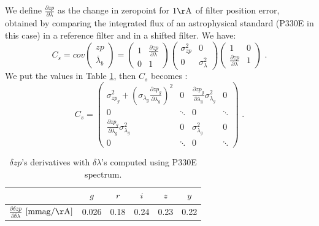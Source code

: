 \documentclass[\docopts]{\docclass}
\begin{document}
We define $\frac{\partial zp}{\partial \lambda}$ as the change in zeropoint for $1 \mathrm{\AA}$ of filter position error, obtained by comparing the integrated flux of an astrophysical standard (P330E in this case) in a reference filter and in a shifted filter.
We have:
\begin{equation}
C_s = cov
\begin{pmatrix}
  zp \\
  \bar\lambda_b
\end{pmatrix}
=
\begin{pmatrix}
  1 & \frac{\partial zp}{\partial \lambda} \\
  0 & 1
\end{pmatrix}
\begin{pmatrix}
  \sigma_{zp}^2 & 0 \\
  0 & \sigma_{\lambda}^2
\end{pmatrix}
\begin{pmatrix}
  1 & 0 \\
  \frac{\partial zp}{\partial \lambda} & 1
\end{pmatrix}\text{ .}
\end{equation}
We put the values in Table \ref{tab::calib_derivatives}, then $C_s$ becomes :
\begin{equation}
\label{eq::cov_calib}
C_s = 
\left( \begin{array}{cc|cc} \sigma^2_{ zp_{g}} + (\sigma_{\lambda_g} \frac{\partial zp_g}{\partial \lambda_g})^2 & 0 & \frac{\partial zp_g}{\partial \lambda_g} \sigma^2_{ \lambda_g} & 0 \\ 0 & \ddots & 0 & \ddots \\ \hline \frac{\partial zp_g}{\partial \lambda_g} \sigma^2_{ \lambda_g} & 0 & \sigma^2_{\lambda_{g}} & 0 \\ 0 & \ddots & 0 & \ddots \end{array} \right) \text{ .}
\end{equation}

\begin{table}[t]
\begin{center}
\caption{$\delta zp$'s derivatives with $\delta\lambda$'s computed using P330E spectrum.}
\label{tab::calib_derivatives}
\begin{tabular}{l|ccccc}
\hline
\hline
  & $g$ & $r$ & $i$ & $z$ & $y$ \\
\hline 
  $\frac{\partial\delta zp}{\partial\delta \lambda}$ $[\mathrm{mmag/\AA}]$& 0.026 & 0.18 & 0.24 & 0.23 & 0.22\\
\hline
\end{tabular}
\end{center}
\end{table}
\end{document}

